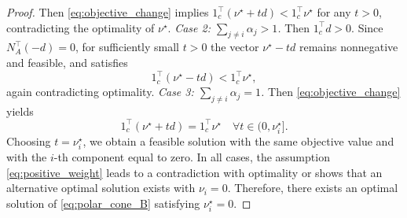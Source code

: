 \documentclass[letterpaper, 10 pt, conference]{ieeeconf}  %
\begin{document}
{\begin{proof}
Then \eqref{eq:objective_change} implies
$1_c^\top(\nu^\star + t d) < 1_c^\top \nu^\star$
for any $t>0$, contradicting the optimality of $\nu^\star$.
\noindent\emph{Case 2: $\sum_{j\neq i}\alpha_j > 1$.}
Then $1_c^\top d > 0$. Since $N_A^\top(-d)=0$, for sufficiently small $t>0$
the vector $\nu^\star - t d$ remains nonnegative and feasible, and satisfies
\[
1_c^\top(\nu^\star - t d)
< 1_c^\top \nu^\star,
\]
again contradicting optimality.
\noindent\emph{Case 3: $\sum_{j\neq i}\alpha_j = 1$.}
Then \eqref{eq:objective_change} yields
\[
1_c^\top(\nu^\star + t d) = 1_c^\top \nu^\star
\quad \forall t\in(0,\nu^\star_i].
\]
Choosing $t=\nu^\star_i$, we obtain a feasible solution with the same objective
value and with the $i$-th component equal to zero.
In all cases, the assumption \eqref{eq:positive_weight} leads to a contradiction
with optimality or shows that an alternative optimal solution exists with
$\nu_i=0$. Therefore, there exists an optimal solution of \eqref{eq:polar_cone_B} satisfying
$\nu^\star_i=0$.
\end{proof}
}
\end{document}
